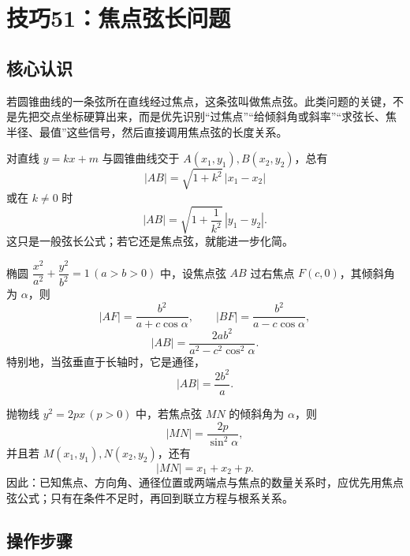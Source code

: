 \documentclass[UTF8,a4paper,11pt]{ctexart}
\begin{document}
\clearpage

\section{技巧51：焦点弦长问题}

\subsection*{核心认识}

若圆锥曲线的一条弦所在直线经过焦点，这条弦叫做焦点弦。此类问题的关键，不是先把交点坐标硬算出来，而是优先识别“过焦点”“给倾斜角或斜率”“求弦长、焦半径、最值”这些信号，然后直接调用焦点弦的长度关系。

对直线 $y=kx+m$ 与圆锥曲线交于 $A(x_1,y_1),B(x_2,y_2)$，总有
\[
|AB|=\sqrt{1+k^2}\,|x_1-x_2|
\]
或在 $k\ne 0$ 时
\[
|AB|=\sqrt{1+\frac1{k^2}}\,|y_1-y_2|.
\]
这只是一般弦长公式；若它还是焦点弦，就能进一步化简。

椭圆 $\dfrac{x^2}{a^2}+\dfrac{y^2}{b^2}=1\,(a>b>0)$ 中，设焦点弦 $AB$ 过右焦点 $F(c,0)$，其倾斜角为 $\alpha$，则
\[
|AF|=\frac{b^2}{a+c\cos\alpha},\qquad |BF|=\frac{b^2}{a-c\cos\alpha},
\]
\[
|AB|=\frac{2ab^2}{a^2-c^2\cos^2\alpha}.
\]
特别地，当弦垂直于长轴时，它是通径，
\[
|AB|=\frac{2b^2}{a}.
\]

抛物线 $y^2=2px\,(p>0)$ 中，若焦点弦 $MN$ 的倾斜角为 $\alpha$，则
\[
|MN|=\frac{2p}{\sin^2\alpha},
\]
并且若 $M(x_1,y_1),N(x_2,y_2)$，还有
\[
|MN|=x_1+x_2+p.
\]
因此：已知焦点、方向角、通径位置或两端点与焦点的数量关系时，应优先用焦点弦公式；只有在条件不足时，再回到联立方程与根系关系。

\subsection*{操作步骤}
\end{document}
